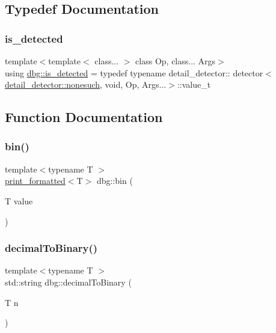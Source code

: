 \subsection{Typedef Documentation}
\mbox{\label{namespacedbg_a4fff29dc9282f3e887a7c1290477708c}} 
\subsubsection{\texorpdfstring{is\+\_\+detected}{is\_detected}}
{\footnotesize\ttfamily template$<$template$<$ class... $>$ class Op, class... Args$>$ \\
using \hyperlink{namespacedbg_a4fff29dc9282f3e887a7c1290477708c}{dbg\+::is\+\_\+detected} = typedef typename detail\+\_\+detector\+:: detector$<$\hyperlink{structdbg_1_1detail__detector_1_1nonesuch}{detail\+\_\+detector\+::nonesuch}, void, Op, Args...$>$\+::value\+\_\+t}



\subsection{Function Documentation}
\mbox{\label{namespacedbg_a554c31997738273466a9f1fd426a3369}} 
\subsubsection{\texorpdfstring{bin()}{bin()}}
{\footnotesize\ttfamily template$<$typename T $>$ \\
\hyperlink{structdbg_1_1print__formatted}{print\+\_\+formatted}$<$T$>$ dbg\+::bin (\begin{DoxyParamCaption}\item[{T}]{value }\end{DoxyParamCaption})}

\mbox{\label{namespacedbg_acbbd001b36aaa78716ea7d9d2aeb3e46}} 
\subsubsection{\texorpdfstring{decimal\+To\+Binary()}{decimalToBinary()}}
{\footnotesize\ttfamily template$<$typename T $>$ \\
std\+::string dbg\+::decimal\+To\+Binary (\begin{DoxyParamCaption}\item[{T}]{n }\end{DoxyParamCaption})}

